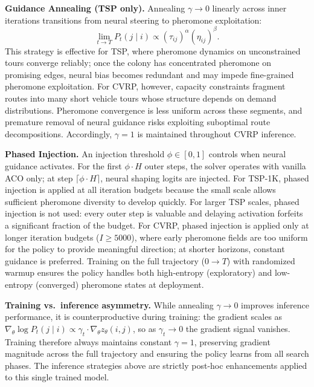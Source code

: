 \documentclass[sigconf,nonacm]{acmart}
\begin{document}
\textbf{Guidance Annealing (TSP only).}
Annealing $\gamma \to 0$ linearly across inner iterations transitions from neural steering to pheromone exploitation:
\begin{equation}
\lim_{t \to T} P_t(j \mid i) \propto (\tau_{ij})^\alpha (\eta_{ij})^\beta.
\end{equation}
This strategy is effective for TSP, where pheromone dynamics on unconstrained tours converge reliably; once the colony has concentrated pheromone on promising edges, neural bias becomes redundant and may impede fine-grained pheromone exploitation.
For CVRP, however, capacity constraints fragment routes into many short vehicle tours whose structure depends on demand distributions.
Pheromone convergence is less uniform across these segments, and premature removal of neural guidance risks exploiting suboptimal route decompositions.
Accordingly, $\gamma{=}1$ is maintained throughout CVRP inference.

\textbf{Phased Injection.}
An injection threshold $\phi \in [0,1]$ controls when neural guidance activates.
For the first $\phi \cdot H$ outer steps, the solver operates with vanilla ACO only; at step $\lceil\phi \cdot H\rceil$, neural shaping logits are injected.
For TSP-1K, phased injection is applied at all iteration budgets because the small scale allows sufficient pheromone diversity to develop quickly.
For larger TSP scales, phased injection is not used: every outer step is valuable and delaying activation forfeits a significant fraction of the budget.
For CVRP, phased injection is applied only at longer iteration budgets ($I{\geq}5000$), where early pheromone fields are too uniform for the policy to provide meaningful direction; at shorter horizons, constant guidance is preferred.
Training on the full trajectory ($0 \to T$) with randomized warmup ensures the policy handles both high-entropy (exploratory) and low-entropy (converged) pheromone states at deployment.

\textbf{Training vs.\ inference asymmetry.}
While annealing $\gamma \to 0$ improves inference performance, it is counterproductive during training: the gradient scales as $\nabla_\theta \log P_t(j \mid i) \propto \gamma_t \cdot \nabla_\theta z_\theta(i,j)$, so as $\gamma_t \to 0$ the gradient signal vanishes.
Training therefore always maintains constant $\gamma{=}1$, preserving gradient magnitude across the full trajectory and ensuring the policy learns from all search phases.
The inference strategies above are strictly post-hoc enhancements applied to this single trained model.
\end{document}
